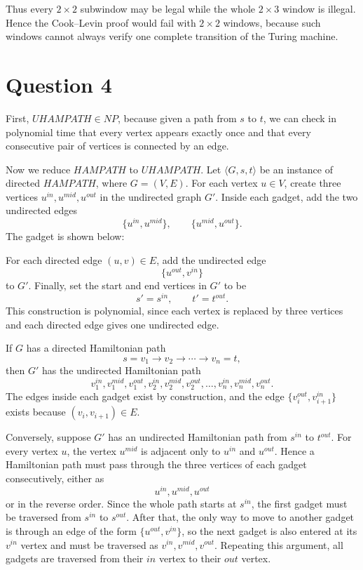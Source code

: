 \documentclass[a4paper, UTF-8]{article}
\theoremstyle{plain}
\begin{document}
Thus every $2\times 2$ subwindow may be legal while the whole $2\times 3$
window is illegal. Hence the Cook--Levin proof would fail with $2\times 2$
windows, because such windows cannot always verify one complete transition of
the Turing machine.

\section{Question 4} 

First, $UHAMPATH\in NP$, because given a path from $s$ to $t$, we can check in
polynomial time that every vertex appears exactly once and that every
consecutive pair of vertices is connected by an edge.

Now we reduce $HAMPATH$ to $UHAMPATH$. Let $\langle G,s,t\rangle$ be an
instance of directed $HAMPATH$, where $G=(V,E)$. For each vertex $u\in V$, create
three vertices $u^{in},u^{mid},u^{out}$ in the undirected graph $G'$. Inside each
gadget, add the two undirected edges
\[
\{u^{in},u^{mid}\},\qquad \{u^{mid},u^{out}\}.
\]
The gadget is shown below:
\begin{center}
\end{center}

For each directed edge $(u,v)\in E$, add the undirected edge
\[
\{u^{out},v^{in}\}
\]
to $G'$. Finally, set the start and end vertices in $G'$ to be
\[
s'=s^{in},\qquad t'=t^{out}.
\]
This construction is polynomial, since each vertex is replaced by three
vertices and each directed edge gives one undirected edge.

If $G$ has a directed Hamiltonian path
\[
s=v_1\to v_2\to \cdots \to v_n=t,
\]
then $G'$ has the undirected Hamiltonian path
\[
v_1^{in},v_1^{mid},v_1^{out},
v_2^{in},v_2^{mid},v_2^{out},
\ldots,
v_n^{in},v_n^{mid},v_n^{out}.
\]
The edges inside each gadget exist by construction, and the edge
$\{v_i^{out},v_{i+1}^{in}\}$ exists because $(v_i,v_{i+1})\in E$.

Conversely, suppose $G'$ has an undirected Hamiltonian path from $s^{in}$ to
$t^{out}$. For every vertex $u$, the vertex $u^{mid}$ is adjacent only to
$u^{in}$ and $u^{out}$. Hence a Hamiltonian path must pass through the three
vertices of each gadget consecutively, either as
\[
u^{in},u^{mid},u^{out}
\]
or in the reverse order. Since the whole path starts at $s^{in}$, the first
gadget must be traversed from $s^{in}$ to $s^{out}$. After that, the only way to
move to another gadget is through an edge of the form
$\{u^{out},v^{in}\}$, so the next gadget is also entered at its $v^{in}$ vertex
and must be traversed as $v^{in},v^{mid},v^{out}$. Repeating this argument, all
gadgets are traversed from their $in$ vertex to their $out$ vertex.
\end{document}
